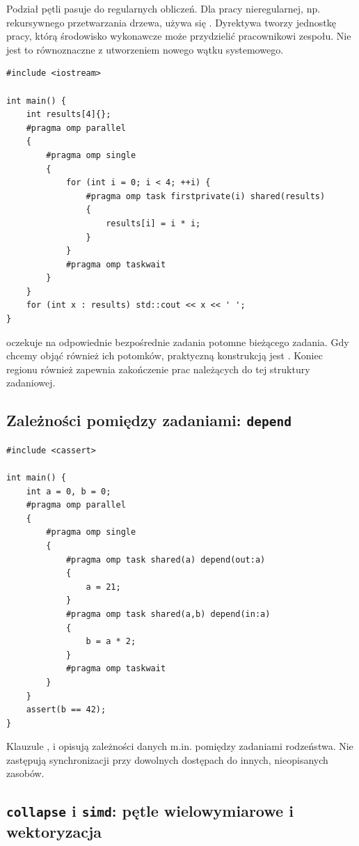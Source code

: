 Podział pętli  pasuje do regularnych obliczeń. Dla pracy
nieregularnej, np. rekursywnego przetwarzania drzewa, używa się
. Dyrektywa tworzy jednostkę pracy, którą środowisko
wykonawcze może przydzielić pracownikowi zespołu. Nie jest to
równoznaczne z utworzeniem nowego wątku systemowego.

\begin{lstlisting}[caption={Tworzenie i oczekiwanie na zadania OpenMP.}]
#include <iostream>

int main() {
    int results[4]{};
    #pragma omp parallel
    {
        #pragma omp single
        {
            for (int i = 0; i < 4; ++i) {
                #pragma omp task firstprivate(i) shared(results)
                {
                    results[i] = i * i;
                }
            }
            #pragma omp taskwait
        }
    }
    for (int x : results) std::cout << x << ' ';
}
\end{lstlisting}

 oczekuje na odpowiednie bezpośrednie zadania potomne
bieżącego zadania. Gdy chcemy objąć również ich potomków,
praktyczną konstrukcją jest . Koniec regionu
 również zapewnia zakończenie prac należących
do tej struktury zadaniowej.

\subsection{Zależności pomiędzy zadaniami: \texttt{depend}}

\begin{lstlisting}[caption={Zadanie drugie korzysta z wyniku pierwszego.}]
#include <cassert>

int main() {
    int a = 0, b = 0;
    #pragma omp parallel
    {
        #pragma omp single
        {
            #pragma omp task shared(a) depend(out:a)
            {
                a = 21;
            }
            #pragma omp task shared(a,b) depend(in:a)
            {
                b = a * 2;
            }
            #pragma omp taskwait
        }
    }
    assert(b == 42);
}
\end{lstlisting}

Klauzule ,  i
 opisują zależności danych m.in.
pomiędzy zadaniami rodzeństwa. Nie zastępują synchronizacji
przy dowolnych dostępach do innych, nieopisanych zasobów.

\subsection{\texttt{collapse} i \texttt{simd}: pętle wielowymiarowe i wektoryzacja}

